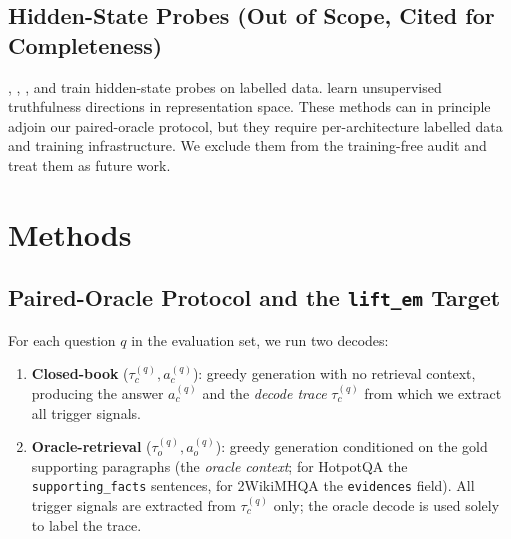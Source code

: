 \documentclass[11pt]{article}
\begin{document}
\subsection{Hidden-State Probes (Out of Scope, Cited for Completeness)}
\label{sec:related-hidden-probes}

\cite{Lu_StreamingHallucinationDetectionCoT},
\cite{Zhang_AnswerAgreementRepresentationShaping}, \cite{Liu_CtrlA}, and
\cite{Azaria_Mitchell_InternalState} train hidden-state probes on labelled
data. \cite{Burns_CCS} learn unsupervised truthfulness directions in
representation space. These methods can in principle adjoin our paired-oracle
protocol, but they require per-architecture labelled data and training
infrastructure. We exclude them from the training-free audit and treat them as
future work.


\section{Methods}
\label{sec:methods}

\subsection{Paired-Oracle Protocol and the \texttt{lift\_em} Target}
\label{sec:methods-protocol}

For each question $q$ in the evaluation set, we run two decodes:

\begin{enumerate}
\item \textbf{Closed-book} ($\tau_c^{(q)}, a_c^{(q)}$): greedy generation with
no retrieval context, producing the answer $a_c^{(q)}$ and the
\emph{decode trace} $\tau_c^{(q)}$ from which we extract all trigger signals.
\item \textbf{Oracle-retrieval} ($\tau_o^{(q)}, a_o^{(q)}$): greedy generation
conditioned on the gold supporting paragraphs (the \emph{oracle context}; for
HotpotQA the \texttt{supporting\_facts} sentences, for 2WikiMHQA the
\texttt{evidences} field). All trigger signals are extracted from
$\tau_c^{(q)}$ only; the oracle decode is used solely to label the trace.
\end{enumerate}
\end{document}
